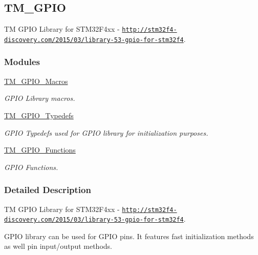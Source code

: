 \hypertarget{group___t_m___g_p_i_o}{}\subsection{T\+M\+\_\+\+G\+P\+I\+O}
\label{group___t_m___g_p_i_o}


T\+M G\+P\+I\+O Library for S\+T\+M32\+F4xx -\/ \href{http://stm32f4-discovery.com/2015/03/library-53-gpio-for-stm32f4}{\tt http\+://stm32f4-\/discovery.\+com/2015/03/library-\/53-\/gpio-\/for-\/stm32f4}.  


\subsubsection*{Modules}
\begin{DoxyCompactItemize}
\item 
\hyperlink{group___t_m___g_p_i_o___macros}{T\+M\+\_\+\+G\+P\+I\+O\+\_\+\+Macros}
\begin{DoxyCompactList}\small\item\em G\+P\+I\+O Library macros. \end{DoxyCompactList}\item 
\hyperlink{group___t_m___g_p_i_o___typedefs}{T\+M\+\_\+\+G\+P\+I\+O\+\_\+\+Typedefs}
\begin{DoxyCompactList}\small\item\em G\+P\+I\+O Typedefs used for G\+P\+I\+O library for initialization purposes. \end{DoxyCompactList}\item 
\hyperlink{group___t_m___g_p_i_o___functions}{T\+M\+\_\+\+G\+P\+I\+O\+\_\+\+Functions}
\begin{DoxyCompactList}\small\item\em G\+P\+I\+O Functions. \end{DoxyCompactList}\end{DoxyCompactItemize}


\subsubsection{Detailed Description}
T\+M G\+P\+I\+O Library for S\+T\+M32\+F4xx -\/ \href{http://stm32f4-discovery.com/2015/03/library-53-gpio-for-stm32f4}{\tt http\+://stm32f4-\/discovery.\+com/2015/03/library-\/53-\/gpio-\/for-\/stm32f4}. 

G\+P\+I\+O library can be used for G\+P\+I\+O pins. It features fast initialization methods as well pin input/output methods.

